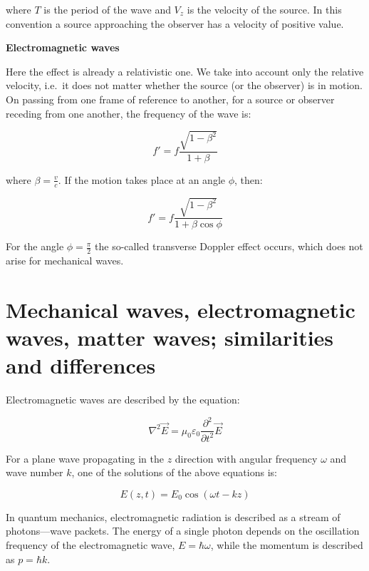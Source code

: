 where $T$ is the period of the wave and $V_{z}$ is the velocity of the source. In this convention a source approaching the observer has a velocity of positive value.

\textbf{Electromagnetic waves}

Here the effect is already a relativistic one. We take into account only the relative velocity, i.e.\ it does not matter whether the source (or the observer) is in motion. On passing from one frame of reference to another, for a source or observer receding from one another, the frequency of the wave is:

\begin{equation}
    f' = f\frac{\sqrt{1-\beta^{2}}}{1+\beta}
\end{equation}

where $\beta = \frac{v}{c}$. If the motion takes place at an angle $\phi$, then:

\begin{equation}
    f' = f\frac{\sqrt{1-\beta^{2}}}{1+\beta\cos{\phi}}
\end{equation}

For the angle $\phi = \frac{\pi}{2}$ the so-called transverse Doppler effect occurs, which does not arise for mechanical waves.

\section{Mechanical waves, electromagnetic waves, matter waves; similarities and differences}

Electromagnetic waves are described by the equation:

\begin{equation}
    \nabla^2\vec{E} = \mu_0 \varepsilon_0\frac{\partial^2}{\partial t^2}\vec{E}
\end{equation}

For a plane wave propagating in the $z$ direction with angular frequency $\omega$ and wave number $k$, one of the solutions of the above equations is:

\begin{equation}
    E(z,t) = E_0\cos \left( \omega t - kz  \right)
\end{equation}

In quantum mechanics, electromagnetic radiation is described as a stream of photons---wave packets. The energy of a single photon depends on the oscillation frequency of the electromagnetic wave, $E = \hbar \omega$, while the momentum is described as $p = \hbar k$.

